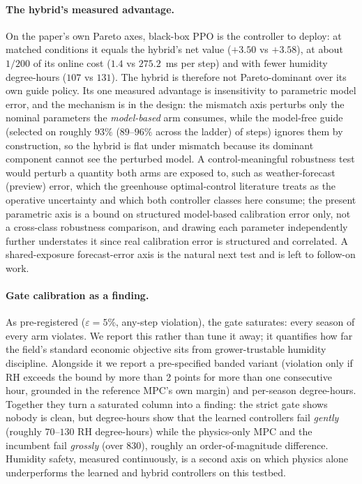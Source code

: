 \documentclass[11pt]{article}
\begin{document}
\paragraph{The hybrid's measured advantage.} On the paper's own Pareto axes, black-box PPO is the controller to deploy: at matched conditions it equals the hybrid's net value ($+3.50$ vs $+3.58$), at about $1/200$ of its online cost ($1.4$ vs $275.2$~ms per step) and with fewer humidity degree-hours ($107$ vs $131$). The hybrid is therefore not Pareto-dominant over its own guide policy. Its one measured advantage is insensitivity to parametric model error, and the mechanism is in the design: the mismatch axis perturbs only the nominal parameters the \emph{model-based} arm consumes, while the model-free guide (selected on roughly $93\%$ ($89$--$96\%$ across the ladder) of steps) ignores them by construction, so the hybrid is flat under mismatch because its dominant component cannot see the perturbed model.
A control-meaningful robustness test would perturb a quantity both arms are exposed to, such as weather-forecast (preview) error, which the greenhouse optimal-control literature treats as the operative uncertainty \citep{vanhenten2009timescale} and which both controller classes here consume; the present parametric axis is a bound on structured model-based calibration error only, not a cross-class robustness comparison, and drawing each parameter independently further understates it since real calibration error is structured and correlated. A shared-exposure forecast-error axis is the natural next test and is left to follow-on work.

\paragraph{Gate calibration as a finding.} As pre-registered ($\varepsilon = 5\%$, any-step violation), the gate saturates: every season of every arm violates. We report this rather than tune it away; it quantifies how far the field's standard economic objective sits from grower-trustable humidity discipline. Alongside it we report a pre-specified banded variant (violation only if RH exceeds the
bound by more than 2 points for more than one consecutive hour, grounded in the reference
MPC's own margin) and per-season degree-hours. Together they turn a saturated column into
a finding: the strict gate shows nobody is clean, but degree-hours show that the learned
controllers fail \emph{gently} (roughly $70$--$130$ RH degree-hours) while the
physics-only MPC and the incumbent fail \emph{grossly} (over $830$), roughly an order-of-magnitude
difference. Humidity safety, measured continuously, is a second axis on which physics
alone underperforms the learned and hybrid controllers on this testbed.
\end{document}
